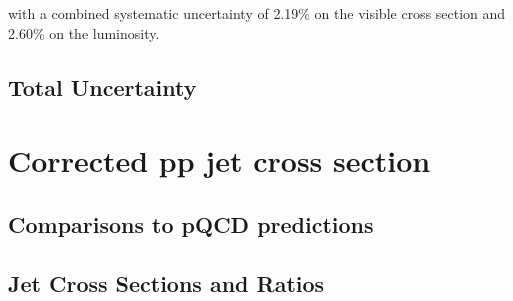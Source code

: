 with a combined systematic uncertainty of 2.19\% on the visible cross section and 2.60\% on the luminosity. 


\subsection{Total Uncertainty}

\section{Corrected pp jet cross section}


\subsection{Comparisons to pQCD predictions}

\subsection{Jet Cross Sections and Ratios}



